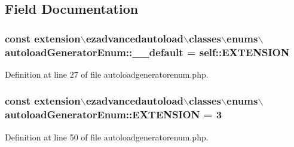 \subsection{Field Documentation}
\hypertarget{classextension_1_1ezadvancedautoload_1_1classes_1_1enums_1_1autoload_generator_enum_aa803b338dcea315c5ba70ecdc103f306}{
\subsubsection[{\-\_\-\-\_\-default}]{\setlength{\rightskip}{0pt plus 5cm}const {\bf extension$\backslash$ezadvancedautoload$\backslash$classes$\backslash$enums$\backslash$autoload\-Generator\-Enum\-::\-\_\-\-\_\-default} = self\-::\-E\-X\-T\-E\-N\-S\-I\-O\-N}}\label{classextension_1_1ezadvancedautoload_1_1classes_1_1enums_1_1autoload_generator_enum_aa803b338dcea315c5ba70ecdc103f306}


Definition at line 27 of file autoloadgeneratorenum.\-php.

\hypertarget{classextension_1_1ezadvancedautoload_1_1classes_1_1enums_1_1autoload_generator_enum_a46f25431900773dbb0f22b71add686ce}{
\subsubsection[{E\-X\-T\-E\-N\-S\-I\-O\-N}]{\setlength{\rightskip}{0pt plus 5cm}const {\bf extension$\backslash$ezadvancedautoload$\backslash$classes$\backslash$enums$\backslash$autoload\-Generator\-Enum\-::\-E\-X\-T\-E\-N\-S\-I\-O\-N} = 3}}\label{classextension_1_1ezadvancedautoload_1_1classes_1_1enums_1_1autoload_generator_enum_a46f25431900773dbb0f22b71add686ce}


Definition at line 50 of file autoloadgeneratorenum.\-php.

